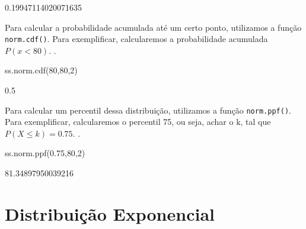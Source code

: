 \documentclass[
  letterpaper,
  DIV=11,
  numbers=noendperiod]{scrreprt}
\newenvironment{Shaded}{\begin{snugshade}}{\end{snugshade}}
\newcommand{\DecValTok}[1]{\textcolor[rgb]{0.68,0.00,0.00}{#1}}
\newcommand{\FloatTok}[1]{\textcolor[rgb]{0.68,0.00,0.00}{#1}}
\newcommand{\NormalTok}[1]{\textcolor[rgb]{0.00,0.23,0.31}{#1}}
\begin{document}
\begin{tcolorbox}[enhanced jigsaw, breakable, leftrule=.75mm, left=2mm, opacityback=0, bottomrule=.15mm, toprule=.15mm, rightrule=.15mm, arc=.35mm, colback=white]

0.19947114020071635

\end{tcolorbox}

Para calcular a probabilidade acumulada até um certo ponto, utilizamos a
função \texttt{norm.cdf()}. Para exemplificar, calcularemos a
probabilidade acumulada \(P(x<80)\). .

\begin{Shaded}
\begin{Highlighting}[]
\NormalTok{ss.norm.cdf(}\DecValTok{80}\NormalTok{,}\DecValTok{80}\NormalTok{,}\DecValTok{2}\NormalTok{)}
\end{Highlighting}
\end{Shaded}

\begin{tcolorbox}[enhanced jigsaw, breakable, leftrule=.75mm, left=2mm, opacityback=0, bottomrule=.15mm, toprule=.15mm, rightrule=.15mm, arc=.35mm, colback=white]

0.5

\end{tcolorbox}

Para calcular um percentil dessa distribuição, utilizamos a função
\texttt{norm.ppf()}. Para exemplificar, calcularemos o percentil 75, ou
seja, achar o k, tal que \(P(X≤k)=0.75\). .

\begin{Shaded}
\begin{Highlighting}[]
\NormalTok{ss.norm.ppf(}\FloatTok{0.75}\NormalTok{,}\DecValTok{80}\NormalTok{,}\DecValTok{2}\NormalTok{)}
\end{Highlighting}
\end{Shaded}

\begin{tcolorbox}[enhanced jigsaw, breakable, leftrule=.75mm, left=2mm, opacityback=0, bottomrule=.15mm, toprule=.15mm, rightrule=.15mm, arc=.35mm, colback=white]

81.34897950039216

\end{tcolorbox}


\hypertarget{distribuiuxe7uxe3o-exponencial}{%
\chapter{Distribuição
Exponencial}\label{distribuiuxe7uxe3o-exponencial}}
\end{document}
